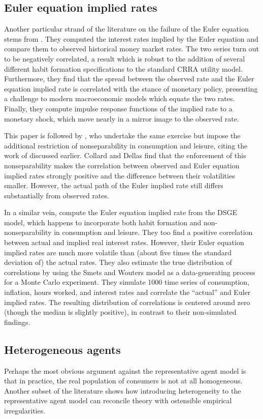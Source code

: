 \subsection{Euler equation implied rates}
Another particular strand of the literature on the failure of the Euler equation stems from \cite{canzoneri07}. They computed the interest rates implied by the Euler equation and compare them to observed historical money market rates. The two series turn out to be negatively correlated, a result which is robust to the addition of several different habit formation specifications to the standard CRRA utility model. Furthermore, they find that the spread between the observed rate and the Euler equation implied rate is correlated with the stance of monetary policy, presenting a challenge to modern macroeconomic models which equate the two rates. Finally, they compute impulse response functions of the implied rate to a monetary shock, which move nearly in a mirror image to the observed rate.

This paper is followed by \cite{collard11}, who undertake the same exercise but impose the additional restriction of nonseparability in consumption and leisure, citing the work of \cite{basu02} discussed earlier. Collard and Dellas find that the enforcement of this nonseparability makes the correlation between observed and Euler equation implied rates strongly positive and the difference between their volatilities smaller. However, the actual path of the Euler implied rate still differs substantially from observed rates.

In a similar vein, \cite{gareis13} compute the Euler equation implied rate from the \cite{smets07} DSGE model, which happens to incorporate both habit formation and non-nonseparability in consumption and leisure. They too find a positive correlation between actual and implied real interest rates. However, their Euler equation implied rates are much more volatile than (about five times the standard deviation of) the actual rates. They also estimate the true distribution of correlations by using the Smets and Wouters model as a data-generating process for a Monte Carlo experiment. They simulate 1000 time series of consumption, inflation, hours worked, and interest rates and correlate the ``actual'' and Euler implied rates. The resulting distribution of correlations is centered around zero (though the median is slightly positive), in contrast to their non-simulated findings.



\subsection{Heterogeneous agents}
Perhaps the most obvious argument against the representative agent model is that in practice, the real population of consumers is not at all homogeneous. Another subset of the literature shows how introducing heterogeneity to the representative agent model can reconcile theory with ostensible empirical irregularities.

